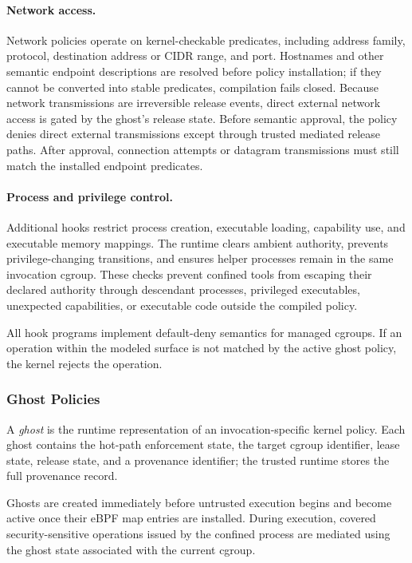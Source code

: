 \paragraph{Network access.}
Network policies operate on kernel-checkable predicates, including address
family, protocol, destination address or CIDR range, and port. Hostnames and
other semantic endpoint descriptions are resolved before policy installation;
if they cannot be converted into stable predicates, compilation fails closed.
Because network transmissions are irreversible release events, direct external
network access is gated by the ghost's release state. Before semantic approval,
the policy denies direct external transmissions except through trusted mediated
release paths. After approval, connection attempts or datagram transmissions
must still match the installed endpoint predicates.

\paragraph{Process and privilege control.}
Additional hooks restrict process creation, executable loading, capability use,
and executable memory mappings. The runtime clears ambient authority, prevents
privilege-changing transitions, and ensures helper processes remain in the same
invocation cgroup. These checks prevent confined tools from escaping their
declared authority through descendant processes, privileged executables,
unexpected capabilities, or executable code outside the compiled policy.

All hook programs implement default-deny semantics for managed cgroups. If an
operation within the modeled surface is not matched by the active ghost policy,
the kernel rejects the operation.

\subsubsection{Ghost Policies}
\label{sec:design:ebpf:lifecycle}

A \emph{ghost} is the runtime representation of an invocation-specific kernel
policy. Each ghost contains the hot-path enforcement state, the target cgroup
identifier, lease state, release state, and a provenance identifier; the trusted
runtime stores the full provenance record.

Ghosts are created immediately before untrusted execution begins and become
active once their eBPF map entries are installed. During execution, covered
security-sensitive operations issued by the confined process are mediated using
the ghost state associated with the current cgroup.

